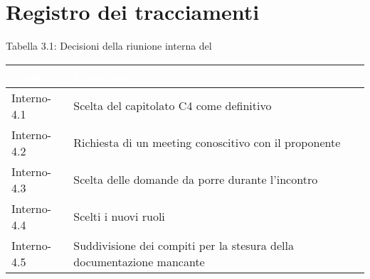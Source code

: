 \section{Registro dei tracciamenti}
{
Tabella 3.1: Decisioni della riunione interna del \Data{}
\renewcommand{\arraystretch}{1.5}
\centering
\begin{longtable}{C{3cm} C{9cm}}
\textcolor{white}{\textbf{Codice}}&
\textcolor{white}{\textbf{Decisione}}\\	
\endhead
		
Interno-4.1 & Scelta del capitolato C4 come definitivo\\

Interno-4.2 & Richiesta di un meeting conoscitivo con il proponente\\

Interno-4.3 & Scelta delle domande da porre durante l'incontro\\

Interno-4.4 & Scelti i nuovi ruoli\\

Interno-4.5 & Suddivisione dei compiti per la stesura della documentazione mancante\\
		
\end{longtable}
}
